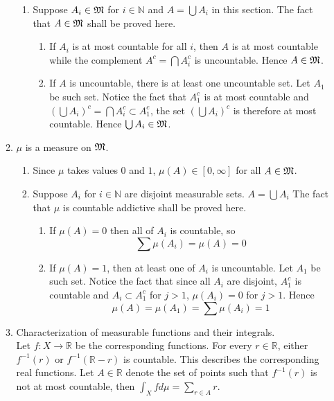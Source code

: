 \documentclass{article}
\begin{document}
\begin{enumerate}
\begin{enumerate}
\begin{enumerate}
 			\item Suppose $A_i\in\mathfrak{M}$ for $i\in\mathbb{N}$ and $A=\bigcup A_i$ in this section. The fact that $A\in\mathfrak{M}$ shall be proved here.
 			\begin{enumerate}
 				 \item If $A_i$ is at most countable for all $i$, then $A$ is at most countable while the complement $A^c=\bigcap A_i^c$ is uncountable. Hence $A\in\mathfrak{M}$. 
 				 \item If $A$ is uncountable, there is at least one uncountable set. Let $A_1$ be such set. Notice the fact that $A_1^c$ is at most countable and $(\bigcup A_i)^c=\bigcap A_i^c\subset A_1^c$, the set $(\bigcup A_i)^c$ is therefore at most countable. Hence $\bigcup A_i\in\mathfrak{M}$.
 			\end{enumerate}
 		\end{enumerate}
 		\item $\mu$ is a measure on $\mathfrak{M}$.
 		\begin{enumerate}
 			\item Since $\mu$ takes values $0$ and $1$, $\mu(A)\in[0,\infty]$ for all $A\in\mathfrak{M}$.
 			\item Suppose $A_i$  for $i\in\mathbb{N}$ are disjoint measurable sets. $A=\bigcup A_i$ The fact that $\mu$ is countable addictive shall be proved here.
 				\begin{enumerate}
 					\item If $\mu(A)=0$ then all of $A_i$ is countable, so
 					\[
 						\sum\mu(A_i)=\mu(A)=0
 					\]
 					\item If $\mu(A)=1$, then at least one of $A_i$ is uncountable. Let $A_1$ be such set. Notice the fact that since all $A_i$ are disjoint, $A_1^c$ is countable and $A_i\subset A_1^c$ for $j>1$, $\mu(A_i)=0$ for $j>1$. Hence
 					\[
 						\mu(A)=\mu(A_1)=\sum\mu(A_i)=1
 					\]
 				\end{enumerate}
 		\end{enumerate}
 		\item Characterization of measurable functions and their integrals.\\
 		Let $f:X\to\mathbb{R}$ be the corresponding functions. For every $r\in\mathbb{R}$, either $f^{-1}({r})$ or $f^{-1}(\mathbb{R}-{r})$ is countable. This describes the corresponding real functions. Let $A\in\mathbb{R}$ denote the set of points such that $f^{-1}(r)$ is not at most countable, then $\int_{X}fd\mu=\sum_{r\in{A}}r$.
 		

\end{enumerate}
\end{enumerate}
\end{document}
